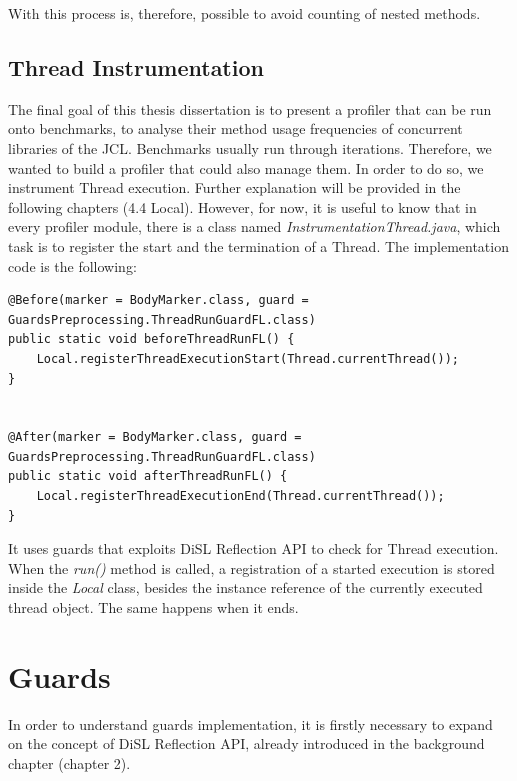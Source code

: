 \documentclass[]{usiinfthesis}
\begin{document}
With this process is, therefore, possible to avoid counting of nested methods.

\subsection{Thread Instrumentation}
The final goal of this thesis dissertation is to present a profiler that can be run onto benchmarks, to analyse their method usage frequencies of concurrent libraries of the JCL. Benchmarks usually run through iterations. Therefore, we wanted to build a profiler that could also manage them. In order to do so, we instrument Thread execution. Further explanation will be provided in the following chapters (4.4 Local). However, for now, it is useful to know that in every profiler module, there is a class named \textit{InstrumentationThread.java}, which task is to register the start and the termination of a Thread. The implementation code is the  following:

\vspace*{0.5cm}
\begin{verbatim}
@Before(marker = BodyMarker.class, guard = GuardsPreprocessing.ThreadRunGuardFL.class)
public static void beforeThreadRunFL() {
    Local.registerThreadExecutionStart(Thread.currentThread());
}


@After(marker = BodyMarker.class, guard = GuardsPreprocessing.ThreadRunGuardFL.class)
public static void afterThreadRunFL() {
    Local.registerThreadExecutionEnd(Thread.currentThread());
}
\end{verbatim}
\vspace*{0.5cm}

\noindent
It uses guards that exploits DiSL Reflection API to check for Thread execution. When the \textit{run()} method is called, a registration of a started execution is stored inside the \textit{Local} class, besides the instance reference of the currently executed thread object. The same happens when it ends.

\section{Guards}
In order to understand guards implementation, it is firstly necessary to expand on the concept of DiSL Reflection API, already introduced in the background chapter (chapter 2).
\end{document}
